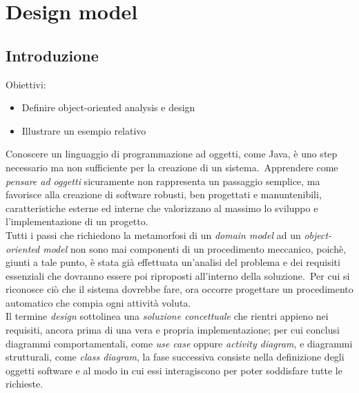 \documentclass{article}
\begin{document}
\pagestyle{empty}
\section*{Design model}
\large

\subsection*{Introduzione}
\large
Obiettivi:
\begin{itemize}
    \renewcommand{\labelitemi}{-}
    \itemsep0em
    \item Definire object-oriented analysis e design
    \item Illustrare un esempio relativo
\end{itemize}
Conoscere un linguaggio di programmazione ad oggetti, come Java, è uno step necessario ma non sufficiente per la creazione di un sistema.\ Apprendere come \textit{pensare ad oggetti} sicuramente non rappresenta un passaggio semplice, ma favorisce alla creazione di software robusti, ben progettati e manuntenibili, caratteristiche esterne ed interne che valorizzano al massimo lo sviluppo e l'implementazione di un progetto.\vspace*{14pt}\\
Tutti i passi che richiedono la metamorfosi di un \textit{domain model} ad un \textit{object-oriented model} non sono mai componenti di un procedimento meccanico, poichè, giunti a tale punto, è stata già effettuata un'analisi del problema e dei requisiti essenziali che dovranno essere poi riproposti all'interno della soluzione.\ Per cui si riconosce ciò che il sistema dovrebbe fare, ora occorre progettare un procedimento automatico che compia ogni attività voluta.\vspace*{14pt}\\
Il termine \textit{design} sottolinea una \textit{soluzione concettuale} che rientri appieno nei requisiti, ancora prima di una vera e propria implementazione; per cui conclusi diagrammi comportamentali, come \textit{use case} oppure \textit{activity diagram}, e diagrammi strutturali, come \textit{class diagram}, la fase successiva consiste nella definizione degli oggetti software e al modo in cui essi interagiscono per poter soddisfare tutte le richieste.
\end{document}
